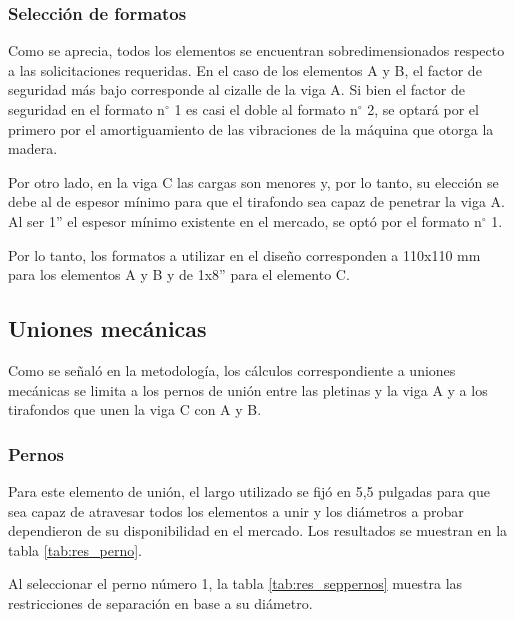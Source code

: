 \subsubsection{Selección de formatos}
Como se aprecia, todos los elementos se encuentran sobredimensionados respecto a las solicitaciones requeridas. En el caso de los elementos A y B, el factor de seguridad más bajo corresponde al cizalle de la viga A. Si bien el factor de seguridad en el formato n$^{\circ}$ 1 es casi el doble al formato n$^{\circ}$ 2, se optará por el primero por el amortiguamiento de las vibraciones de la máquina que otorga la madera.

Por otro lado, en la viga C las cargas son menores y, por lo tanto, su elección se debe al de espesor mínimo para que el tirafondo sea capaz de penetrar la viga A. Al ser 1'' el espesor mínimo existente en el mercado, se optó por el formato n$^{\circ}$ 1.

Por lo tanto, los formatos a utilizar en el diseño corresponden a 110x110 mm para los elementos A y B y de 1x8'' para el elemento C.

\subsection{Uniones mecánicas}

Como se señaló en la metodología, los cálculos correspondiente a uniones mecánicas se limita a los pernos de unión entre las pletinas y la viga A y a los tirafondos que unen la viga C con A y B.

\subsubsection{Pernos}
Para este elemento de unión, el largo utilizado se fijó en 5,5 pulgadas para que sea capaz de atravesar todos los elementos a unir y los diámetros a probar dependieron de su disponibilidad en el mercado. Los resultados se muestran en la tabla \ref{tab:res_perno}. 

Al seleccionar el perno número 1, la tabla \ref{tab:res_seppernos} muestra las restricciones de separación en base a su diámetro.

\begin{table}[h]
\centering
{}
\caption{Cargas admisibles y factor de seguridad para distintos pernos hexagonales.}
\label{tab:res_perno}
\end{table}

